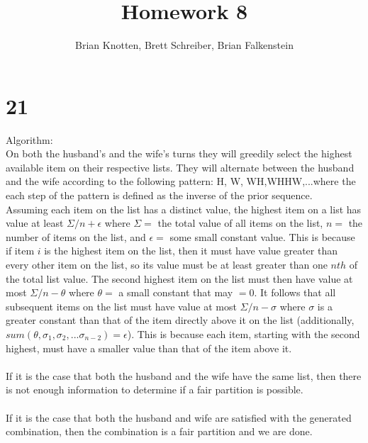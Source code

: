 \documentclass[letterpaper,notitlepage,twoside]{article}
\begin{document}
\title{Homework 8}
\author{Brian Knotten, Brett Schreiber, Brian Falkenstein}
\maketitle

\section*{21}
Algorithm: \\
On both the husband's and the wife's turns they will greedily select the highest available item on their respective lists. They will alternate between the husband and the wife according to the following pattern: H, W, WH,WHHW,...where the each step of the pattern is defined as the inverse of the prior sequence. \\
Assuming each item on the list has a distinct value, the highest item on a list has value at least $\Sigma / n + \epsilon$ where $\Sigma =$ the total value of all items on the list, $n =$ the number of items on the list, and $\epsilon =$ some small constant value. This is because if item $i$ is the highest item on the list, then it must have value greater than every other item on the list, so its value must be at least greater than one $nth$ of the total list value. The second highest item on the list must then have value at most $\Sigma / n - \theta$ where $\theta =$ a small constant that may $=0$. It follows that all subsequent items on the list must have value at most $\Sigma / n - \sigma$ where $\sigma$ is a greater constant than that of the item directly above it on the list (additionally, $sum(\theta, \sigma_1, \sigma_2, ...\sigma_{n-2}) = \epsilon$). This is because each item, starting with the second highest, must have a smaller value than that of the item above it. \\ \\
If it is the case that both the husband and the wife have the same list, then there is not enough information to determine if a fair partition is possible. \\ \\
If it is the case that both the husband and wife are satisfied with the generated combination, then the combination is a fair partition and we are done. \\ \\
\end{document}

